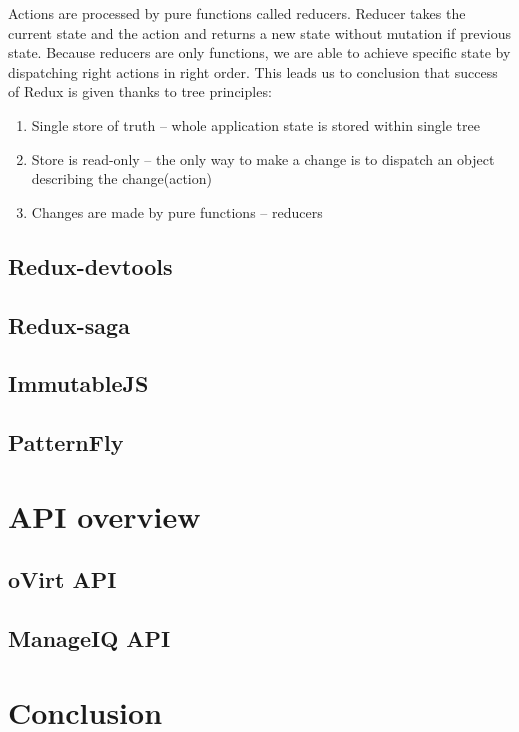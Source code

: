 Actions are processed by pure functions called reducers. Reducer takes the current state and the action and returns a new state without mutation if previous state. Because reducers are only functions, we are able to achieve specific state by dispatching right actions in right order. This leads us to conclusion that success of Redux is given thanks to tree principles:
\begin{enumerate}
\item Single store of truth -- whole application state is stored within single tree
\item Store is read-only -- the only way to make a change is to dispatch an object describing the change(action)
\item Changes are made by pure functions -- reducers 
\end{enumerate}

\section{Redux-devtools}
\section{Redux-saga}
\section{ImmutableJS}
\section{PatternFly}

\chapter{API overview}

\section{oVirt API}
\section{ManageIQ API}







\chapter{Conclusion}


